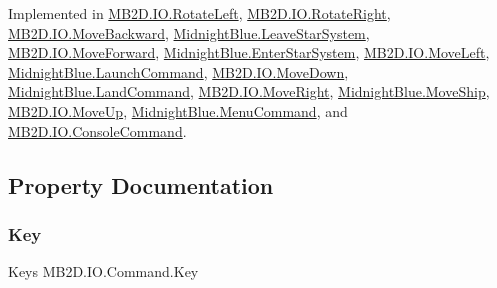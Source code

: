 Implemented in \hyperlink{class_m_b2_d_1_1_i_o_1_1_rotate_left_adf98596b3689a88aaf1334e00b548443}{M\+B2\+D.\+I\+O.\+Rotate\+Left}, \hyperlink{class_m_b2_d_1_1_i_o_1_1_rotate_right_a416106025812db523b009155d462cb6b}{M\+B2\+D.\+I\+O.\+Rotate\+Right}, \hyperlink{class_m_b2_d_1_1_i_o_1_1_move_backward_a15c5da82d35b95c0a04e8fdc89dcd839}{M\+B2\+D.\+I\+O.\+Move\+Backward}, \hyperlink{class_midnight_blue_1_1_leave_star_system_ad2e048edbe7a4816d9ed8fc87cf4eb91}{Midnight\+Blue.\+Leave\+Star\+System}, \hyperlink{class_m_b2_d_1_1_i_o_1_1_move_forward_a32d5bfbf101ab8ff8150f2f07f0b5ac8}{M\+B2\+D.\+I\+O.\+Move\+Forward}, \hyperlink{class_midnight_blue_1_1_enter_star_system_a1cf84a93760ef0cda918915ec8acfa4d}{Midnight\+Blue.\+Enter\+Star\+System}, \hyperlink{class_m_b2_d_1_1_i_o_1_1_move_left_aa74df62134ee5fc3a5b2503114a5a7e6}{M\+B2\+D.\+I\+O.\+Move\+Left}, \hyperlink{class_midnight_blue_1_1_launch_command_a5da2fdd898111ea59f4f63126c380a3e}{Midnight\+Blue.\+Launch\+Command}, \hyperlink{class_m_b2_d_1_1_i_o_1_1_move_down_af93adf7def9f4869528ee2c86b474c19}{M\+B2\+D.\+I\+O.\+Move\+Down}, \hyperlink{class_midnight_blue_1_1_land_command_a2c496d96aed4498bb3ca133fcea4b172}{Midnight\+Blue.\+Land\+Command}, \hyperlink{class_m_b2_d_1_1_i_o_1_1_move_right_aa0d9913727d27d01dff4fdd394e2f6f4}{M\+B2\+D.\+I\+O.\+Move\+Right}, \hyperlink{class_midnight_blue_1_1_move_ship_ac4b3dcb62954548f27bad5e5d6a00cdf}{Midnight\+Blue.\+Move\+Ship}, \hyperlink{class_m_b2_d_1_1_i_o_1_1_move_up_acb3f90aeea44eeffefbb664e898b0a91}{M\+B2\+D.\+I\+O.\+Move\+Up}, \hyperlink{class_midnight_blue_1_1_menu_command_a2101f922aa12bd7fed4eff3eb714a9d4}{Midnight\+Blue.\+Menu\+Command}, and \hyperlink{class_m_b2_d_1_1_i_o_1_1_console_command_ad46e036e534b3b1cd1503782042d358f}{M\+B2\+D.\+I\+O.\+Console\+Command}.



\subsection{Property Documentation}
\hypertarget{class_m_b2_d_1_1_i_o_1_1_command_a42f1ab4c0c10b351e296d23713bd0a6a}{}\label{class_m_b2_d_1_1_i_o_1_1_command_a42f1ab4c0c10b351e296d23713bd0a6a} 
\subsubsection{\texorpdfstring{Key}{Key}}
{\footnotesize\ttfamily Keys M\+B2\+D.\+I\+O.\+Command.\+Key\hspace{0.3cm}{\ttfamily [get]}}



